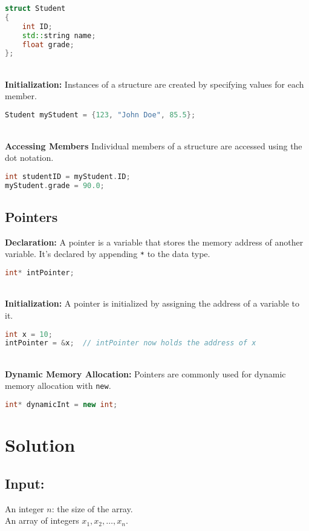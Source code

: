 \documentclass[12pt, a4paper]{report}
\begin{document}
\begin{lstlisting}[language=C++]
struct Student 
{
    int ID;
    std::string name;
    float grade;
};
\end{lstlisting}

\textbf{\\Initialization:}
Instances of a structure are created by specifying values for each member.

\begin{lstlisting}[language=C++]
Student myStudent = {123, "John Doe", 85.5};
\end{lstlisting}

\textbf{\\Accessing Members}
Individual members of a structure are accessed using the dot notation.

\begin{lstlisting}[language=C++]
int studentID = myStudent.ID;
myStudent.grade = 90.0;
\end{lstlisting}

\subsection*{Pointers}

\textbf{Declaration:}
A pointer is a variable that stores the memory address of another variable. It's declared by appending \texttt{*} to the data type.

\begin{lstlisting}[language=C++]
int* intPointer;
\end{lstlisting}
\textbf{\\Initialization:}
A pointer is initialized by assigning the address of a variable to it.

\begin{lstlisting}[language=C++]
int x = 10;
intPointer = &x;  // intPointer now holds the address of x
\end{lstlisting}
\textbf{\\Dynamic Memory Allocation:}
Pointers are commonly used for dynamic memory allocation with \texttt{new}.

\begin{lstlisting}[language=C++]
int* dynamicInt = new int;
\end{lstlisting}
\newpage
\section*{Solution}

\subsection*{Input:}
An integer \( n \): the size of the array.\\
An array of integers \( x_1, x_2, \ldots, x_n \).
\end{document}
